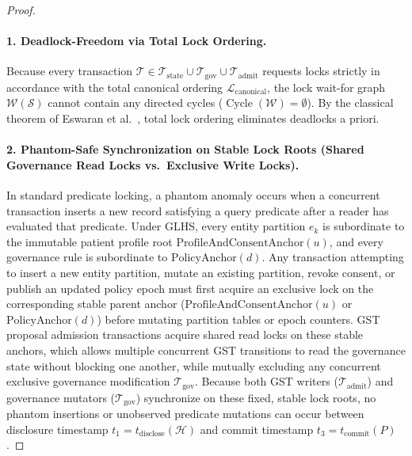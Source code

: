 \documentclass[11pt]{article}
\begin{document}
\begin{proof}
\paragraph{1. Deadlock-Freedom via Total Lock Ordering.}
Because every transaction $\mathcal{T} \in \mathcal{T}_{\text{state}} \cup \mathcal{T}_{\text{gov}} \cup \mathcal{T}_{\text{admit}}$ requests locks strictly in accordance with the total canonical ordering $\mathcal{L}_{\text{canonical}}$, the lock wait-for graph $\mathcal{W}(\mathcal{S})$ cannot contain any directed cycles ($\operatorname{Cycle}(\mathcal{W}) = \emptyset$). By the classical theorem of Eswaran et al.~\cite{eswaran1976}, total lock ordering eliminates deadlocks a priori.

\paragraph{2. Phantom-Safe Synchronization on Stable Lock Roots (Shared Governance Read Locks vs.\ Exclusive Write Locks).}
In standard predicate locking, a phantom anomaly occurs when a concurrent transaction inserts a new record satisfying a query predicate after a reader has evaluated that predicate. Under GLHS, every entity partition $e_k$ is subordinate to the immutable patient profile root $\text{ProfileAndConsentAnchor}(u)$, and every governance rule is subordinate to $\text{PolicyAnchor}(d)$. Any transaction attempting to insert a new entity partition, mutate an existing partition, revoke consent, or publish an updated policy epoch must first acquire an exclusive lock on the corresponding stable parent anchor ($\text{ProfileAndConsentAnchor}(u)$ or $\text{PolicyAnchor}(d)$) before mutating partition tables or epoch counters. GST proposal admission transactions acquire shared read locks on these stable anchors, which allows multiple concurrent GST transitions to read the governance state without blocking one another, while mutually excluding any concurrent exclusive governance modification $\mathcal{T}_{\text{gov}}$. Because both GST writers ($\mathcal{T}_{\text{admit}}$) and governance mutators ($\mathcal{T}_{\text{gov}}$) synchronize on these fixed, stable lock roots, no phantom insertions or unobserved predicate mutations can occur between disclosure timestamp $t_1 = t_{\text{disclose}}(\mathcal{H})$ and commit timestamp $t_3 = t_{\text{commit}}(P)$.


\end{proof}
\end{document}
